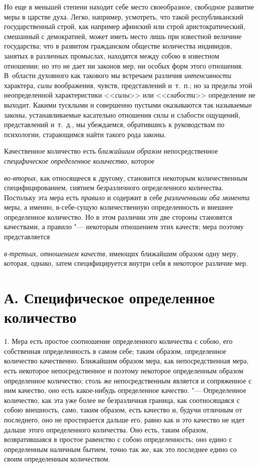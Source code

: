 Но еще в меньшей степени находит себе место своеобразное, свободное развитие
меры в царстве духа. Легко, например, усмотреть, что такой республиканский
государственный строй, как например афинский или строй аристократический,
смешанный с демократией, может иметь место лишь при известной величине
государства; что в развитом гражданском обществе количества индивидов,
занятых в различных промыслах, находятся между собою в известном отношении;
но это не дает ни законов мер, ни особых форм этого отношения. В~области
духовного как такового мы встречаем различия
{\em интенсивности} характера,
{\em силы} воображения, чувств, представлений и~т.~п.;
но за пределы этой неопределенной характеристики
<<{\em силы}>> или <<{\em слабости}>>
определение не выходит. Какими тусклыми и совершенно пустыми оказываются
так называемые законы, устанавливаемые касательно отношения силы и слабости
ощущений, представлений и~т.~д., мы убеждаемся, обратившись к руководствам
по психологии, старающимся найти такого рода законы.


Качественное количество есть {\em ближайшим образом} непосредственное
{\em специфическое определенное количество}, которое

{\em во-вторых}, как относящееся к другому, становится
некоторым количественным специфицированием, снятием безразличного
определенного количества. Постольку эта мера есть
{\em правило} и содержит в себе
{\em различенными оба момента} меры, а именно,
в-себе-сущую количественную определенность и внешнее определенное
количество. Но в этом различии эти две стороны становятся качествами, а
правило "--- некоторым отношением этих качеств; мера поэтому представляется

{\em в-третьих}, {\em отношением
качеств}, имеющих ближайшим образом одну меру, которая, однако, затем
специфицируется внутри себя в некоторое различие мер.

\section[А. Специфическое определенное количество]{А. Специфическое
определенное количество}

1. Мера есть простое соотношение определенного
количества с собою, его собственная определенность в самом себе; таким
образом, определенное количество качественно. Ближайшим образом мера, как
непосредственная мера, есть некоторое непосредственное и поэтому некоторое
определенным образом определенное количество; столь же непосредственным
является и сопряженное с ним качество, оно есть какое-нибудь определенное
качество. "--- Определенное количество, как эта уже более не безразличная
граница, как соотносящаяся с собою внешность, само, таким образом, есть
качество и, будучи отличным от последнего, оно не простирается дальше его,
равно как и это качество не идет дальше этого определенного количества. Оно
есть, таким образом, возвратившаяся в простое равенство с собою
определенность; оно едино с определенным наличным бытием, точно так же, как
это последнее едино со своим определенным количеством.

